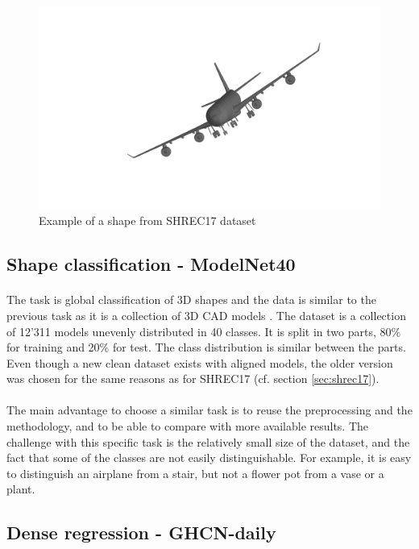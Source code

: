 \documentclass[11pt]{report}
\begin{document}
\begin{figure}[!ht]
    \centering
    \includegraphics[width=0.6\linewidth, angle=-30, trim={2cm 3cm 2cm 1cm}, clip]{3_front.png}
    \caption{Example of a shape from SHREC17 dataset}
    \label{fig:airplane_shrec17}
\end{figure}

\subsection{Shape classification - ModelNet40}\label{sec:mn40}
\paragraph*{}
The task is global classification of 3D shapes and the data is similar to the previous task as it is a collection of 3D CAD models \cite{zhirong_wu_3d_2015}.
The dataset is a collection of 12'311 models unevenly distributed in 40 classes. It is split in two parts, 80\% for training and 20\% for test. The class distribution is similar between the parts.
Even though a new clean dataset exists with aligned models, the older version was chosen for the same reasons as for SHREC17 (cf. section \ref{sec:shrec17}).

\paragraph*{}
The main advantage to choose a similar task is to reuse the preprocessing and the methodology, and to be able to compare with more available results. The challenge with this specific task is the relatively small size of the dataset, and the fact that some of the classes are not easily distinguishable. For example, it is easy to distinguish an airplane from a stair, but not a flower pot from a vase or a plant.

\subsection{Dense regression - GHCN-daily}
\end{document}
